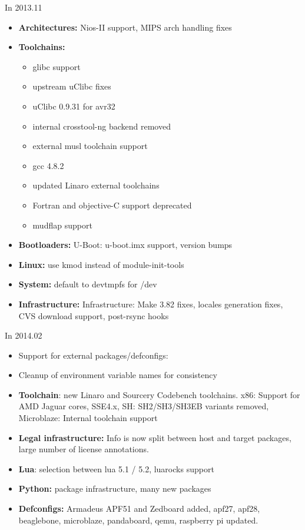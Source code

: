 \begin{frame}{In 2013.11}
  \begin{itemize}
  \item {\bf Architectures:} Nios-II support, MIPS arch handling fixes
  \item {\bf Toolchains:}
    \begin{itemize}
    \item glibc support
    \item upstream uClibc fixes
    \item uClibc 0.9.31 for avr32
    \item internal crosstool-ng backend removed
    \item external musl toolchain support
    \item gcc 4.8.2
    \item updated Linaro external toolchains
    \item Fortran and objective-C support deprecated
    \item mudflap support
    \end{itemize}
  \item {\bf Bootloaders:} U-Boot: u-boot.imx support, version bumps
  \item {\bf Linux:} use kmod instead of module-init-tools
  \item {\bf System:} default to devtmpfs for /dev
  \item {\bf Infrastructure:} Infrastructure: Make 3.82 fixes, locales
    generation fixes, CVS download support, post-rsync hooks
  \end{itemize}
\end{frame}

\begin{frame}{In 2014.02}
  \begin{itemize}
  \item Support for external packages/defconfigs: 
  \item Cleanup of environment variable names for consistency
  \item {\bf Toolchain}: new Linaro and Sourcery Codebench
    toolchains. x86: Support for AMD Jaguar cores, SSE4.x, SH:
    SH2/SH3/SH3EB variants removed, Microblaze: Internal toolchain
    support
  \item {\bf Legal infrastructure:} Info is now split between host and
    target packages, large number of license annotations.
  \item {\bf Lua}: selection between lua 5.1 / 5.2, luarocks support
  \item {\bf Python:} package infrastructure, many new packages
  \item {\bf Defconfigs:} Armadeus APF51 and Zedboard added, apf27,
    apf28, beaglebone, microblaze, pandaboard, qemu, raspberry pi
    updated.
  \end{itemize}
\end{frame}

